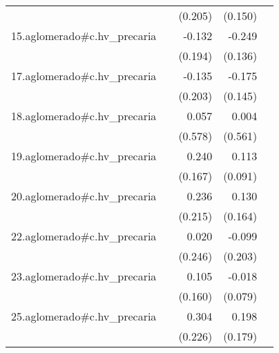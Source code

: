 {\begin{longtable}{l*{4}{D{.}{.}{-1}}}
            &                     &     (0.205)         &     (0.150)         &                     \\
\addlinespace
15.aglomerado#c.hv\_precaria&                     &      -0.132         &      -0.249         &                     \\
            &                     &     (0.194)         &     (0.136)         &                     \\
\addlinespace
17.aglomerado#c.hv\_precaria&                     &      -0.135         &      -0.175         &                     \\
            &                     &     (0.203)         &     (0.145)         &                     \\
\addlinespace
18.aglomerado#c.hv\_precaria&                     &       0.057         &       0.004         &                     \\
            &                     &     (0.578)         &     (0.561)         &                     \\
\addlinespace
19.aglomerado#c.hv\_precaria&                     &       0.240         &       0.113         &                     \\
            &                     &     (0.167)         &     (0.091)         &                     \\
\addlinespace
20.aglomerado#c.hv\_precaria&                     &       0.236         &       0.130         &                     \\
            &                     &     (0.215)         &     (0.164)         &                     \\
\addlinespace
22.aglomerado#c.hv\_precaria&                     &       0.020         &      -0.099         &                     \\
            &                     &     (0.246)         &     (0.203)         &                     \\
\addlinespace
23.aglomerado#c.hv\_precaria&                     &       0.105         &      -0.018         &                     \\
            &                     &     (0.160)         &     (0.079)         &                     \\
\addlinespace
25.aglomerado#c.hv\_precaria&                     &       0.304         &       0.198         &                     \\
            &                     &     (0.226)         &     (0.179)         &                     \\

\end{longtable}}
